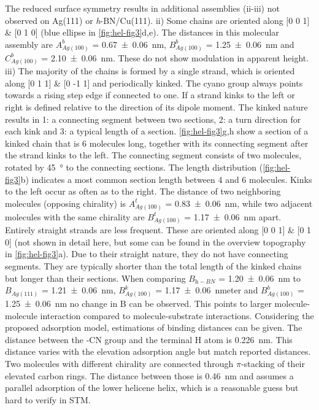 The reduced surface symmetry results in additional assemblies (ii-iii) not observed on Ag(111) or \textit{h}-BN/Cu(111). ii) Some chains are oriented along [0 0 1] \& [0 1 0] (blue ellipse in \autoref{fig:hel-fig3}d,e). The distances in this molecular assembly are $A^b_{Ag(100)}$ = \SI{0.67 \pm 0.06}{\nano \meter}, $B^b_{Ag(100)}$ = \SI{1.25 \pm 0.06}{\nano \meter} and $C^b_{Ag(100)}$ = \SI{2.10 \pm 0.06}{\nano \meter}. These do not show modulation in apparent height. iii) The majority of the chains is formed by a single strand, which is oriented along [0 1 1] \& [0 -1 1] and periodically kinked. The cyano group always points towards a rising step edge if connected to one. If a strand kinks to the left or right is defined relative to the direction of its dipole moment. The kinked nature results in 1: a connecting segment between two sections, 2: a turn direction for each kink and 3: a typical length of a section. \autoref{fig:hel-fig3}g,h show a section of a kinked chain that is 6 molecules long, together with its connecting segment after the strand kinks to the left. The connecting segment consists of two molecules, rotated by \SI{45}{\degree} to the connecting sections. The length distribution (\autoref{fig:hel-fig3}b) indicates a most common section length between 4 and 6 molecules. Kinks to the left occur as often as to the right. The distance of two neighboring molecules (opposing chirality) is $A^t_{Ag(100)}$ = \SI{0.83 \pm 0.06}{\nano \meter}, while two adjacent molecules with the same chirality are $B^t_{Ag(100)}$ = \SI{1.17 \pm 0.06}{\nano \meter} apart. Entirely straight strands are less frequent. These are oriented along [0 0 1] \& [0 1 0] (not shown in detail here, but some can be found in the overview topography in \autoref{fig:hel-fig3}a). Due to their straight nature, they do not have connecting segments. They are typically shorter than the total length of the kinked chains but longer than their sections. When comparing $B_{\textit{h}-BN}$ = \SI{1.20 \pm 0.06}{\nano \meter} to $B_{Ag(111)}$ = \SI{1.21 \pm 0.06}{\nano \meter}, $B^k_{Ag(100)}$ = \SI{1.17 \pm 0.06}{\nano meter} and $B^b_{Ag(100)}$ = \SI{1.25 \pm  0.06}{\nano \meter} no change in B can be observed. This points to larger molecule-molecule interaction compared to molecule-substrate interactions. Considering the proposed adsorption model, estimations of binding distances can be given. The distance between the -CN group and the terminal H atom is \SI{0.226}{\nano \meter}. This distance varies with the elevation adsorption angle but match reported distances.\cite{Li_Tight_2007,Kaposi_Supramolecular_2016,Schlickum_Chiral_2008} Two molecules with different chirality are connected through $\pi$-stacking of their elevated carbon rings. The distance between those is \SI{0.46}{\nano \meter} and assumes a parallel adsorption of the lower helicene helix, which is a reasonable guess but hard to verify in STM.

